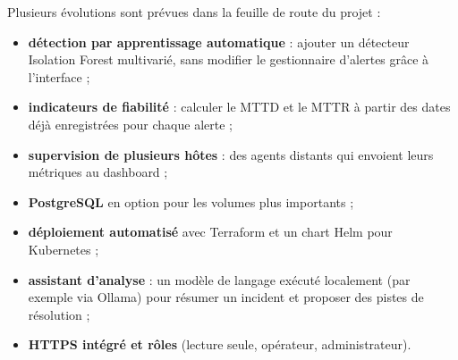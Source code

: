 Plusieurs évolutions sont prévues dans la feuille de route du projet :
\begin{itemize}
  \item \textbf{détection par apprentissage automatique} : ajouter un détecteur Isolation
        Forest multivarié, sans modifier le gestionnaire d'alertes grâce à l'interface
         ;
  \item \textbf{indicateurs de fiabilité} : calculer le MTTD et le MTTR à partir des dates déjà
        enregistrées pour chaque alerte ;
  \item \textbf{supervision de plusieurs hôtes} : des agents distants qui envoient leurs
        métriques au dashboard ;
  \item \textbf{PostgreSQL} en option pour les volumes plus importants ;
  \item \textbf{déploiement automatisé} avec Terraform et un chart Helm pour Kubernetes ;
  \item \textbf{assistant d'analyse} : un modèle de langage exécuté localement (par exemple via
        Ollama) pour résumer un incident et proposer des pistes de résolution ;
  \item \textbf{HTTPS intégré et rôles} (lecture seule, opérateur, administrateur).
\end{itemize}
